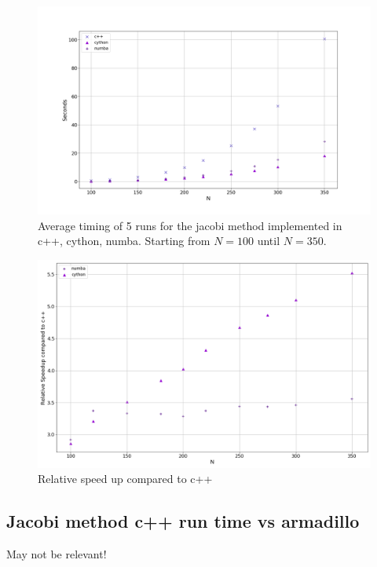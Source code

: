 \begin{figure}[H]
  \centering
  \includegraphics[width=1.0\textwidth]{../figures/speedComp_100_350.png}
  \caption{Average timing of 5 runs for the jacobi method implemented in c++, cython, numba. Starting from $N=100$ until $N=350$.}
  \label{fig:timing_largeN}
\end{figure}

\begin{figure}[H]
  \centering
  \includegraphics[width=1.0\textwidth]{../figures/speedCompC++_100_350.png}
  \caption{Relative speed up compared to c++}
  \label{fig:comp_c++}
\end{figure}

\subsection{Jacobi method c++ run time vs armadillo}
May not be relevant!


